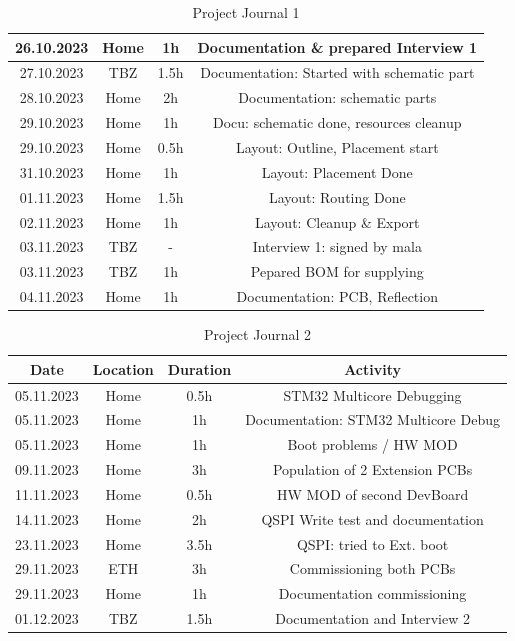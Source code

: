 \begin{table}[H]
\begin{tabular}{||c | c | c || c||}
 \hline
   26.10.2023 & Home & 1h & Documentation \& prepared Interview 1 \\ 
 \hline
  27.10.2023 & TBZ & 1.5h & Documentation: Started with schematic part \\ 
 \hline
  28.10.2023 & Home & 2h & Documentation: schematic parts \\ 
 \hline
  29.10.2023 & Home & 1h & Docu: schematic done, resources cleanup \\ 
 \hline
   29.10.2023 & Home & 0.5h & Layout: Outline, Placement start \\ 
 \hline
   31.10.2023 & Home & 1h & Layout: Placement Done \\ 
 \hline   
   01.11.2023 & Home & 1.5h & Layout: Routing Done \\ 
 \hline
  02.11.2023 & Home & 1h & Layout: Cleanup \& Export \\ 
 \hline
  03.11.2023 & TBZ & - & Interview 1: signed by mala \\ 
 \hline  
  03.11.2023 & TBZ & 1h & Pepared BOM for supplying \\ 
 \hline
  04.11.2023 & Home & 1h & Documentation: PCB, Reflection \\ 
 \hline

\end{tabular}
    \caption{Project Journal 1}\label{tab:Project Journal 1}
\end{table}

\newpage

\begin{table}[H]
  \centering
  
  \begin{tabular}{||c | c | c || c||} 
    \hline
    Date &  Location & Duration & Activity \\ [0.5ex] 
    \hline\hline
    05.11.2023 & Home & 0.5h & STM32 Multicore Debugging \\ 
    \hline
     05.11.2023 & Home & 1h & Documentation: STM32 Multicore Debug \\ 
    \hline
     05.11.2023 & Home & 1h & Boot problems / HW MOD \\ 
    \hline
    09.11.2023 & Home & 3h & Population of 2 Extension PCBs \\ 
    \hline
    11.11.2023 & Home & 0.5h & HW MOD of second DevBoard \\ 
    \hline
    14.11.2023 & Home & 2h & QSPI Write test and documentation \\ 
    \hline
    23.11.2023 & Home & 3.5h & QSPI: tried to Ext. boot \\ 
    \hline
    29.11.2023 & ETH & 3h & Commissioning both PCBs \\ 
    \hline
    29.11.2023 & Home & 1h & Documentation commissioning \\ 
    \hline
    01.12.2023 & TBZ & 1.5h & Documentation and Interview 2 \\ 
    \hline
  \end{tabular}
  \caption{Project Journal 2}\label{tab:Project Journal 2}
\end{table}

